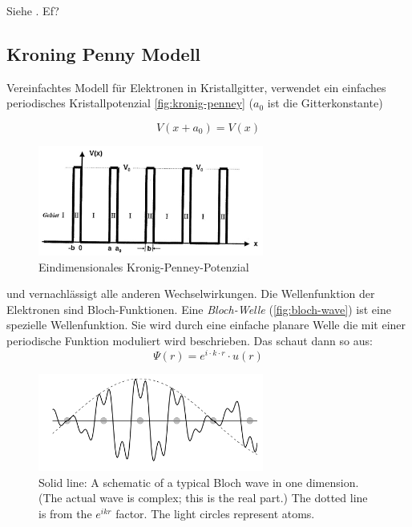 Siehe . Ef?

\subsection{Kroning Penny Modell }\label{k2:kroningpenny}
Vereinfachtes Modell für Elektronen in Kristallgitter, verwendet ein einfaches periodisches Kristallpotenzial \autoref{fig:kronig-penney} ($a_0$ ist die Gitterkonstante)

\begin{equation}
    V(x + a_0) = V(x)
\end{equation}

\begin{figure}
    \centering
    \includegraphics[width=0.66\textwidth]{fig/kronig-penny.jpg}
    \caption{Eindimensionales Kronig-Penney-Potenzial}
    \label{fig:kronig-penney}
\end{figure}

und vernachlässigt alle anderen Wechselwirkungen. Die Wellenfunktion der Elektronen sind Bloch-Funktionen.
Eine \textit{Bloch-Welle} (\autoref{fig:bloch-wave}) ist eine spezielle Wellenfunktion. Sie wird durch eine einfache planare Welle die mit einer periodische Funktion moduliert wird beschrieben.
Das schaut dann so aus:
\begin{equation}
    \Psi(r) = e^{i\cdot k\cdot r}\cdot u(r)
\end{equation}

\begin{figure}
    \centering
    \includegraphics[width=0.66\textwidth]{fig/bloch-wave}
    \caption{Solid line: A schematic of a typical Bloch wave in one dimension. (The actual wave is complex; this is the real part.) The dotted line is from the $e^{ikr}$ factor. The light circles represent atoms.}
    \label{fig:h-wave}
\end{figure}

